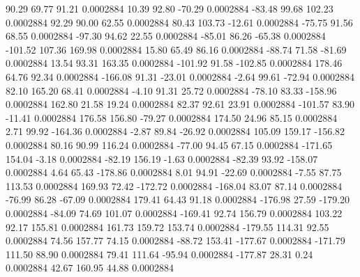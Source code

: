        90.29       69.77       91.21     0.0002884
       10.39       92.80      -70.29     0.0002884
      -83.48       99.68      102.23     0.0002884
       92.29       90.00       62.55     0.0002884
       80.43      103.73      -12.61     0.0002884
      -75.75       91.56       68.55     0.0002884
      -97.30       94.62       22.55     0.0002884
      -85.01       86.26      -65.38     0.0002884
     -101.52      107.36      169.98     0.0002884
       15.80       65.49       86.16     0.0002884
      -88.74       71.58      -81.69     0.0002884
       13.54       93.31      163.35     0.0002884
     -101.92       91.58     -102.85     0.0002884
      178.46       64.76       92.34     0.0002884
     -166.08       91.31      -23.01     0.0002884
       -2.64       99.61      -72.94     0.0002884
       82.10      165.20       68.41     0.0002884
       -4.10       91.31       25.72     0.0002884
      -78.10       83.33     -158.96     0.0002884
      162.80       21.58       19.24     0.0002884
       82.37       92.61       23.91     0.0002884
     -101.57       83.90      -11.41     0.0002884
      176.58      156.80      -79.27     0.0002884
      174.50       24.96       85.15     0.0002884
        2.71       99.92     -164.36     0.0002884
       -2.87       89.84      -26.92     0.0002884
      105.09      159.17     -156.82     0.0002884
       80.16       90.99      116.24     0.0002884
      -77.00       94.45       67.15     0.0002884
     -171.65      154.04       -3.18     0.0002884
      -82.19      156.19       -1.63     0.0002884
      -82.39       93.92     -158.07     0.0002884
        4.64       65.43     -178.86     0.0002884
        8.01       94.91      -22.69     0.0002884
       -7.55       87.75      113.53     0.0002884
      169.93       72.42     -172.72     0.0002884
     -168.04       83.07       87.14     0.0002884
      -76.99       86.28      -67.09     0.0002884
      179.41       64.43       91.18     0.0002884
     -176.98       27.59     -179.20     0.0002884
      -84.09       74.69      101.07     0.0002884
     -169.41       92.74      156.79     0.0002884
      103.22       92.17      155.81     0.0002884
      161.73      159.72      153.74     0.0002884
     -179.55      114.31       92.55     0.0002884
       74.56      157.77       74.15     0.0002884
      -88.72      153.41     -177.67     0.0002884
     -171.79      111.50       88.90     0.0002884
       79.41      111.64      -95.94     0.0002884
     -177.87       28.31        0.24     0.0002884
       42.67      160.95       44.88     0.0002884
